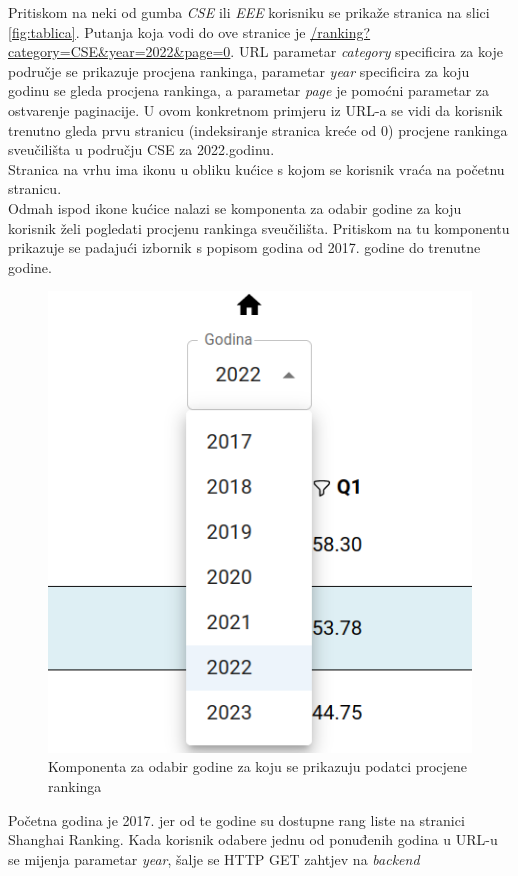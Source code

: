 \documentclass[times, utf8, zavrsni]{fer}
\begin{document}
Pritiskom na neki od gumba \emph{CSE} ili \emph{EEE} korisniku se prikaže stranica na slici \ref{fig:tablica}. Putanja koja vodi do ove stranice 
je \url{/ranking?category=CSE\&year=2022\&page=0}.
URL parametar \emph{category} specificira za koje područje se prikazuje procjena rankinga, parametar \emph{year} specificira
za koju godinu se gleda procjena rankinga, a parametar \emph{page} je pomoćni parametar za ostvarenje paginacije.  
U ovom konkretnom primjeru iz URL-a se vidi da korisnik trenutno gleda prvu stranicu (indeksiranje stranica kreće od 0) procjene rankinga sveučilišta u području CSE za 2022.godinu.
\\Stranica na vrhu ima ikonu u obliku kućice s kojom se korisnik vraća na početnu stranicu. \\Odmah ispod ikone kućice nalazi se komponenta
za odabir godine za koju korisnik želi pogledati procjenu rankinga sveučilišta. Pritiskom na tu komponentu prikazuje se padajući izbornik 
s popisom godina od 2017. godine do trenutne godine. 
\begin{figure}[htb]
    \centering
       \includegraphics[scale=0.24]{select.png} 
       \caption{Komponenta za odabir godine za koju se prikazuju podatci procjene rankinga}
       \label{fig:select}
       \end{figure}
Početna godina je 2017. jer od te godine su dostupne rang liste na stranici 
Shanghai Ranking. Kada korisnik odabere jednu od ponuđenih godina u URL-u se mijenja parametar \emph{year}, šalje se HTTP GET zahtjev na \emph{backend}
\end{document}
